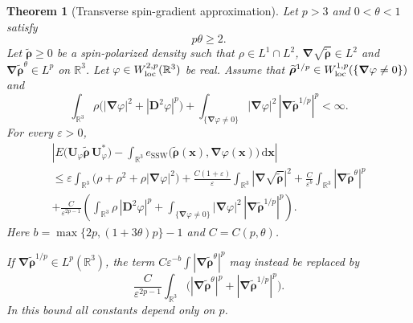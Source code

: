 \documentclass[final,reqno]{amsart}
\newtheorem{theorem}{Theorem}[section]
\theoremstyle{remark}
\renewcommand{\le}{\leqslant}
\renewcommand{\ge}{\geqslant}
\renewcommand{\epsilon}{\varepsilon}
\newcommand{\wt}[1]{\widetilde{#1}}
\newcommand{\RR}{\mathbb{R}}
\newcommand{\SSW}{\mathrm{SSW}}
\newcommand{\grad}{\bm{\nabla}}
\newcommand{\dd}{\mathrm{d}}
\begin{document}
\begin{theorem}[Transverse spin-gradient approximation]\label{thm:LSSWA}
Let $p>3$ and $0<\theta<1$ satisfy
\begin{equation*}
p\theta\ge2.
\end{equation*}
Let $\wt{\bm{\rho}}\ge0$ be a spin-polarized density such that $\rho\in L^1\cap L^2$, $\grad\sqrt{\wt{\bm{\rho}}}\in L^2$ and $\grad\wt{\bm{\rho}}^\theta\in L^p$ on $\RR^3$. Let $\varphi\in W^{2,p}_{\rm loc}(\RR^3)$ be real. Assume that $\wt{\bm{\rho}}^{1/p}\in W^{1,p}_{\rm loc}(\{\grad\varphi\ne0\})$ and
\begin{equation}\label{eq:hyp_phi}
\int_{\RR^3}\rho\big(|\grad\varphi|^2+|\mathbf{D}^2\varphi|^p\big)
+\int_{\{\grad\varphi\ne0\}}|\grad\varphi|^2\,|\grad\wt{\bm{\rho}}^{1/p}|^p<\infty .
\end{equation}
For every $\epsilon>0$,
\begin{multline}\label{eq:LSSWA_estim}
\left|E\big(\mathbf{U}_\varphi\wt{\bm{\rho}}\,\mathbf{U}_\varphi^*\big)-\int_{\RR^3}e_\SSW\big(\wt{\bm{\rho}}(\mathbf{x}),\grad\varphi(\mathbf{x})\big)\,\dd\mathbf{x}\right|\\
\le\epsilon\int_{\RR^3}\big(\rho+\rho^2+\rho|\grad\varphi|^2\big)
+\frac{C(1+\epsilon)}{\epsilon}\int_{\RR^3}|\grad\sqrt{\wt{\bm{\rho}}}|^2
+\frac C{\epsilon^{b}}\int_{\RR^3}|\grad\wt{\bm{\rho}}^\theta|^p\\
+\frac C{\epsilon^{2p-1}}\left(\int_{\RR^3}\rho\,|\mathbf{D}^2\varphi|^p+
\int_{\{\grad\varphi\ne0\}}|\grad\varphi|^2\,|\grad\wt{\bm{\rho}}^{1/p}|^p\right).
\end{multline}
Here $b=\max\{2p,(1+3\theta)p\}-1$ and $C=C(p,\theta)$.

If $\grad\wt{\bm{\rho}}^{1/p}\in L^p(\RR^3)$, the term $C\epsilon^{-b}\int|\grad\wt{\bm{\rho}}^\theta|^p$ may instead be replaced by
\begin{equation}\label{eq:LSSWA_sharp_bulk}
\frac{C}{\epsilon^{2p-1}}\int_{\RR^3}\Big(|\grad\wt{\bm{\rho}}^\theta|^p+|\grad\wt{\bm{\rho}}^{1/p}|^p\Big).
\end{equation}
In this bound all constants depend only on $p$.
\end{theorem}
\end{document}
